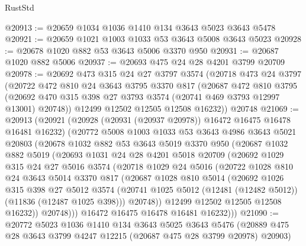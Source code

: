 \begin{lexlean}{RustStd}
\begin{coremodule}
@20913 := @20659 @1034 @1036 @1410 @134 @3643 @5023 @3643 @5478
@20921 := @20659 @1021 @1003 @1033 @53 @3643 @5008 @3643 @5023
@20928 := @20678 @1020 @882 @53 @3643 @5006 @3370 @950
@20931 := @20687 @1020 @882 @5006
@20937 := @20693 @475 @24 @28 @4201 @3799 @20709
@20978 := @20692
    @473
    @315
    @24
    @27
    @3797
    @3574
    (@20718
      @473
      @24
      @3797
      (@20722
        @472
        @810
        @24
        @3643
        @3795
        @3370
        @817
        (@20687
          @472
          @810
          @3795
          (@20692 @470 @315 @398 @27 @3793 @3574 (@20741 @469 @3793 @12997 @13001) @20748))
        @12499
        @12502
        @12505
        @12508
        @16232))
    @20748
@21069 := @20913
    (@20921
      (@20928 (@20931 (@20937 @20978)) @16472 @16475 @16478 @16481 @16232)
      (@20772
        @5008
        @1003
        @1033
        @53
        @3643
        @4986
        @3643
        @5021
        @20803
        (@20678
          @1032
          @882
          @53
          @3643
          @5019
          @3370
          @950
          (@20687
            @1032
            @882
            @5019
            (@20693
              @1031
              @24
              @28
              @4201
              @5018
              @20709
              (@20692
                @1029
                @315
                @24
                @27
                @5016
                @3574
                (@20718
                  @1029
                  @24
                  @5016
                  (@20722
                    @1028
                    @810
                    @24
                    @3643
                    @5014
                    @3370
                    @817
                    (@20687
                      @1028
                      @810
                      @5014
                      (@20692
                        @1026
                        @315
                        @398
                        @27
                        @5012
                        @3574
                        (@20741 @1025 @5012 (@12481 (@12482 @5012)) (@11836 (@12487 @1025 @398)))
                        @20748))
                    @12499
                    @12502
                    @12505
                    @12508
                    @16232))
                @20748)))
          @16472
          @16475
          @16478
          @16481
          @16232)))
@21090 := @20772
    @5023
    @1036
    @1410
    @134
    @3643
    @5025
    @3643
    @5476
    (@20889 @475 @28 @3643 @3799 @4247 @12215 (@20687 @475 @28 @3799 @20978) @20903)

\end{coremodule}
\end{lexlean}
